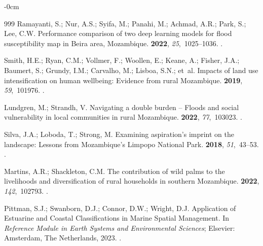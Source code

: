\documentclass[coasts,article,accept,pdftex,oneauthor]{Definitions/mdpi}
\begin{document}
\begin{adjustwidth}{-\extralength}{0cm}
\begin{thebibliography}{999}
Ramayanti, S.; Nur, A.S.; Syifa, M.; Panahi, M.; Achmad, A.R.; Park, S.; Lee,
  C.W.
\newblock Performance comparison of two deep learning models for flood
  susceptibility map in Beira area, Mozambique.
 {\bf
  2022}, {\em 25},~1025--1036.
.

Smith, H.E.; Ryan, C.M.; Vollmer, F.; Woollen, E.; Keane, A.; Fisher, J.A.;
  Baumert, S.; Grundy, I.M.; Carvalho, M.; Lisboa, S.N.;  et~al.
\newblock Impacts of land use intensification on human wellbeing: Evidence from
  rural Mozambique.
 {\bf 2019}, {\em 59},~101976.
.

Lundgren, M.; Strandh, V.
\newblock Navigating a double burden – Floods and social vulnerability in
  local communities in rural Mozambique.
 {\bf 2022},
  {\em 77},~103023.
.

Silva, J.A.; Loboda, T.; Strong, M.
\newblock Examining aspiration’s imprint on the landscape: Lessons from
  Mozambique’s Limpopo National Park.
 {\bf 2018}, {\em 51},~43--53.
.

Martins, A.R.; Shackleton, C.M.
\newblock The contribution of wild palms to the livelihoods and diversification
  of rural households in southern Mozambique.
 {\bf 2022}, {\em 142},~102793.
.

Pittman, S.J.; Swanborn, D.J.; Connor, D.W.; Wright, D.J.
\newblock Application of Estuarine and Coastal Classifications in Marine
  Spatial Management. In {\em Reference Module in Earth Systems and
  Environmental Sciences}; Elsevier: Amsterdam, The Netherlands, 2023. %
.


\end{thebibliography}
\end{adjustwidth}
\end{document}
